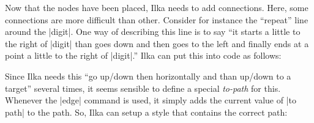 Now that the nodes have been placed, Ilka needs to add
connections. Here, some connections are more difficult than
other. Consider for instance the ``repeat'' line around the
|digit|. One way of describing this line is to say ``it starts a
little to the right of |digit| than goes down and then goes to the
left and finally ends at a point a little to the right of |digit|.''
Ilka can put this into code as follows:
\begin{codeexample}[]
\end{codeexample}

Since Ilka needs this ``go up/down then horizontally and than up/down
to a target'' several times, it seems sensible to define a special
\emph{to-path} for this. Whenever the |edge| command is used, it
simply adds the current value of |to path| to the path. So, Ilka can
setup a style that contains the correct path:
\begin{codeexample}[]
\end{codeexample}

